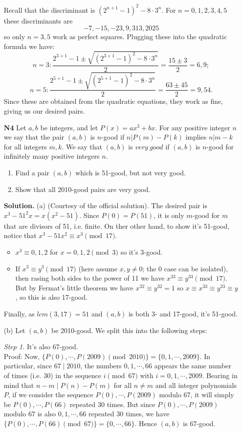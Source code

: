 \documentclass[11pt]{article}
\newcommand{\<}{\langle}
\renewcommand{\>}{\rangle}
\begin{document}
\begin{enumerate}
	Recall that the discriminant is $(2^{n+1}-1)^2-8\cdot 3^n$. 
	For $n=0, 1, 2, 3, 4, 5$ these discriminants are \[-7, -15, -23, 9, 313, 2025\] 
	so only $n=3, 5$ work as perfect squares. Plugging these into the quadratic formula we have: 
	\[
	n=3: \dfrac{2^{3+1}-1 \pm \sqrt{(2^{3+1}-1)^2 - 8\cdot 3^n}}{2} = \dfrac{15\pm 3}{2}=6, 9;\]\[
	n = 5: \dfrac{2^{5+1}-1 \pm \sqrt{(2^{5+1}-1)^2 - 8\cdot 3^n}}{2} = \dfrac{63\pm 45}{2} = 9, 54. 
	\]
	Since these are obtained from the quadratic equations, they work as fine, giving us our desired pairs. 
	
	\item [\textbf{N4}]Let $a, b$ be integers, and let $P(x) = ax^3+bx.$ For any positive integer $n$ we say that the pair $(a,b)$ is $n$-good if $n | P(m)-P(k)$ implies $n | m - k$ for all integers $m, k.$ We say that $(a,b)$ is $very \ good$ if $(a,b)$ is $n$-good for infinitely many positive integers $n.$
	\begin{enumerate}
		\item Find a pair $(a,b)$ which is 51-good, but not very good.
		\item Show that all 2010-good pairs are very good.
		\end{enumerate}
	
	\textbf{Solution.} 
	(a) (Courtesy of the official solution). The desired pair is $x^3-51^2x=x(x^2-51)$. Since $P(0)=P(51)$, it is only $m$-good for $m$ that are divisors of 51, i.e. finite. 
	On ther other hand, to show it's 51-good, notice that $x^3-51x^2\equiv x^3\pmod{17}$. 
	\begin{itemize}
		\item $x^3\equiv 0, 1, 2$ for $x=0, 1, 2\pmod{3}$ so it's 3-good. 
		\item If $x^3\equiv y^3\pmod{17}$ (here assume $x, y\neq 0$; the 0 case can be isolated), then rasing both sides to the power of 11 we have $x^{33}\equiv y^{33}\pmod{17}$. But by Fermat's little theorem we have $x^{32}\equiv y^{32}=1$ so $x\equiv x^{33}\equiv y^{33}\equiv y$, so this is also 17-good. 
	\end{itemize}
	Finally, as $lcm(3, 17)=51$ and $(a, b)$ is both 3- and 17-good, it's 51-good. 
	
	(b) Let $(a, b)$ be 2010-good. We split this into the following steps: 
	
	\emph{Step 1.} It's also 67-good. \\
	Proof: Now, $\{P(0), \cdots , P(2009) \pmod{2010}\}=\{0, 1, \cdots , 2009\}$. In particular, since $67\mid 2010$, the numbers $0, 1, \cdots , 66$ appears the same number of times (i.e. 30) in the sequence $i\pmod{67}$ with $i=0, 1, \cdots , 2009$. 
	Bearing in mind that $n-m\mid P(n)-P(m)$ for all $n\neq m$ and all integer polynomials $P$, if we consider the sequence $P(0), \cdots , P(2009)$ modulo 67, it will simply be $P(0), \cdots , P(66)$ repeated 30 times. But since $P(0), \cdots , P(2009)$ modulo 67 is also $0, 1, \cdots , 66$ repeated 30 times, we have $\{P(0), \cdots , P(66)\pmod{67}\}=\{0, \cdots, 66\}$. Hence $(a, b)$ is 67-good. 
	

\end{enumerate}
\end{document}
